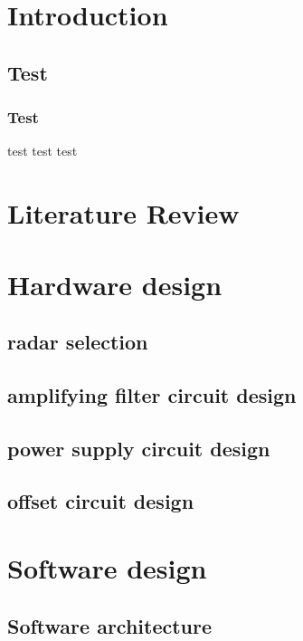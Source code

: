 \thispagestyle{empty}
\newpage

\tableofcontents{\protect\thispagestyle{empty}}
\pagestyle{fancy}
\clearpage
\setcounter{page}{1}
\newpage



\section{Introduction}


\subsection{Test}
\subsubsection{Test}
test \textcite{dirac} test
test


\section{Literature Review}


\section{Hardware design}


\subsection{radar selection}
\subsection{amplifying filter circuit design}
\subsection{power supply circuit design}
\subsection{offset circuit design}


\section{Software design}

\subsection{Software architecture}



